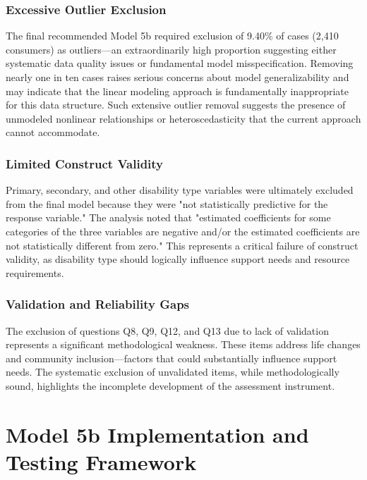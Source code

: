 \subsubsection{Excessive Outlier Exclusion}

The final recommended Model 5b required exclusion of 9.40\% of cases (2,410 consumers) as outliers—an extraordinarily high proportion suggesting either systematic data quality issues or fundamental model misspecification. Removing nearly one in ten cases raises serious concerns about model generalizability and may indicate that the linear modeling approach is fundamentally inappropriate for this data structure. Such extensive outlier removal suggests the presence of unmodeled nonlinear relationships or heteroscedasticity that the current approach cannot accommodate.

\subsubsection{Limited Construct Validity}

Primary, secondary, and other disability type variables were ultimately excluded from the final model because they were "not statistically predictive for the response variable." The analysis noted that "estimated coefficients for some categories of the three variables are negative and/or the estimated coefficients are not statistically different from zero." This represents a critical failure of construct validity, as disability type should logically influence support needs and resource requirements.

\subsubsection{Validation and Reliability Gaps}

The exclusion of questions Q8, Q9, Q12, and Q13 due to lack of validation represents a significant methodological weakness. These items address life changes and community inclusion—factors that could substantially influence support needs. The systematic exclusion of unvalidated items, while methodologically sound, highlights the incomplete development of the assessment instrument.


\section{Model 5b Implementation and Testing Framework}

